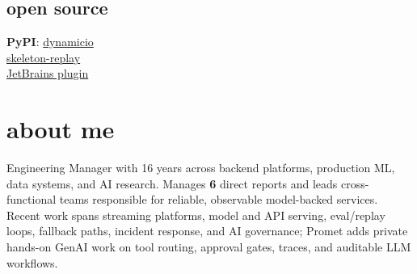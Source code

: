 \documentclass[]{../../friggeri-cv}
\begin{document}
\begin{aside}
    \section{open source}
        {\footnotesize \textbf{PyPI}: \href{https://pypi.org/project/dynamicio/}{dynamicio}\\\href{https://pypi.org/project/skeleton-replay/}{skeleton-replay}\\\href{https://plugins.jetbrains.com/plugin/32807-skeleton-replay}{JetBrains plugin}}
\end{aside}

\section{about me}
{\normalsize Engineering Manager with 16 years across backend platforms, production ML, data systems, and AI research. Manages \textbf{6} direct reports and leads cross-functional teams responsible for reliable, observable model-backed services. Recent work spans streaming platforms, model and API serving, eval/replay loops, fallback paths, incident response, and AI governance; Promet adds private hands-on GenAI work on tool routing, approval gates, traces, and auditable LLM workflows.}
\end{document}
